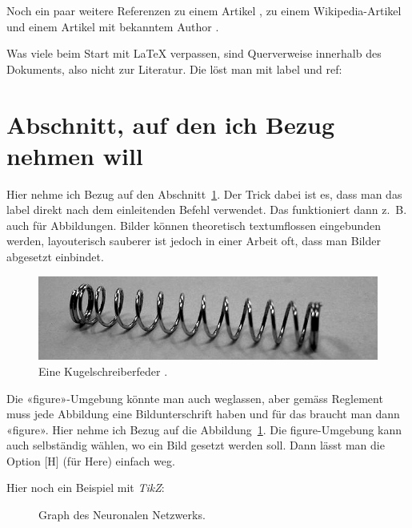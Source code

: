 \documentclass[11pt,DIV=10,final]{scrreprt} %
\begin{document}
Noch ein paar weitere Referenzen zu einem Artikel \citep{kleinerleeb97}, zu einem Wikipedia-Artikel \citep{wikipediapendel} und einem Artikel mit bekanntem Author \citep{knuth}.

Was viele beim Start mit \LaTeX{} verpassen, sind Querverweise innerhalb des Dokuments, also nicht zur Literatur. Die löst man mit label und ref:

\section{Abschnitt, auf den ich Bezug nehmen will}
\label{sec:meinspecialabschnitt}
Hier nehme ich Bezug auf den Abschnitt~\ref{sec:meinspecialabschnitt}. Der Trick dabei ist es, dass man das label direkt nach dem einleitenden Befehl verwendet. Das funktioniert dann z.~B. auch für Abbildungen. Bilder können theoretisch textumflossen eingebunden werden, layouterisch sauberer ist jedoch in einer Arbeit oft, dass man Bilder abgesetzt einbindet.
\begin{figure}[H]
	\begin{center}
		\includegraphics[width=.8\textwidth]{kugelschreiberfeder.jpg}
		\caption{Eine Kugelschreiberfeder \citep{wikipediapendel}.}
		\label{fig:kugelschreiberfeder}
	\end{center}
\end{figure}
Die «figure»-Umgebung könnte man auch weglassen, aber gemäss Reglement muss jede Abbildung eine Bildunterschrift haben und für das braucht man dann «figure». Hier nehme ich Bezug auf die Abbildung~\ref{fig:kugelschreiberfeder}. Die figure-Umgebung kann auch selbständig wählen, wo ein Bild gesetzt werden soll. Dann lässt man die Option [H] (für Here) einfach weg.

Hier noch ein Beispiel mit \emph{TikZ}:
\begin{figure}[H]
	\begin{center}
		\caption{Graph des Neuronalen Netzwerks.}
		\label{fig:neuronalesnetzwerk}
	\end{center}
\end{figure}
\end{document}
